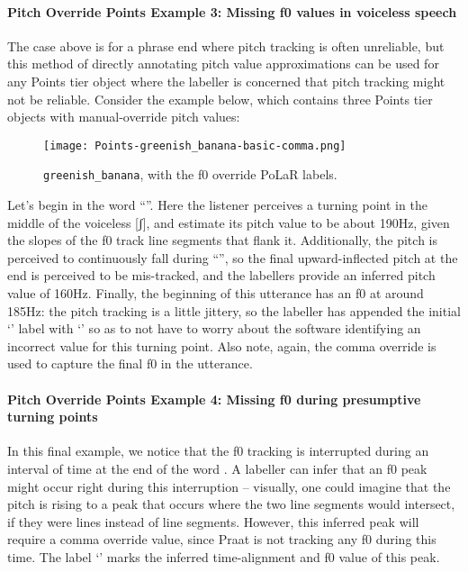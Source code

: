 \paragraph{Pitch Override Points Example 3: Missing f0 values in voiceless speech\label{pitch-override-points-example-3}}

The case above is for a phrase end where pitch tracking is often unreliable, but this method of directly annotating pitch value approximations can be used for any Points tier object where the labeller is concerned that pitch tracking might not be reliable. Consider the example below, which contains three Points tier objects with manual-override pitch values:

\begin{figure}[H]
\centering
%
\texttt{[image: Points-greenish\_banana-basic-comma.png]}
%
\caption{\texttt{greenish\_banana}, with the f0 override PoLaR labels.%
\label{fig:greenish banana Points comma}%
%
}
\end{figure}

Let’s begin in the word “”. Here the listener perceives a turning point in the middle of the voiceless [ʃ], and estimate its pitch value to be about 190Hz, given the slopes of the f0 track line segments that flank it. Additionally, the pitch is perceived to continuously fall during “”, so the final upward-inflected pitch at the end is perceived to be mis-tracked, and the labellers provide an inferred pitch value of 160Hz. Finally, the beginning of this utterance has an f0 at around 185Hz: the pitch tracking is a little jittery, so the labeller has appended the initial ‘’ label with ‘’ so as to not have to worry about the software identifying an incorrect value for this turning point. Also note, again, the comma override is used to capture the final f0 in the utterance.

\paragraph{Pitch Override Points Example 4: Missing f0 during presumptive turning points\label{pitch-override-points-example-4}}

In this final example, we notice that the f0 tracking is interrupted during an interval of time at the end of the word . A labeller can infer that an f0 peak might occur right during this interruption – visually, one could imagine that the pitch is rising to a peak that occurs where the two line segments would intersect, if they were lines instead of line segments. However, this inferred peak will require a comma override value, since Praat is not tracking any f0 during this time. The label ‘’ marks the inferred time-alignment and f0 value of this peak.


